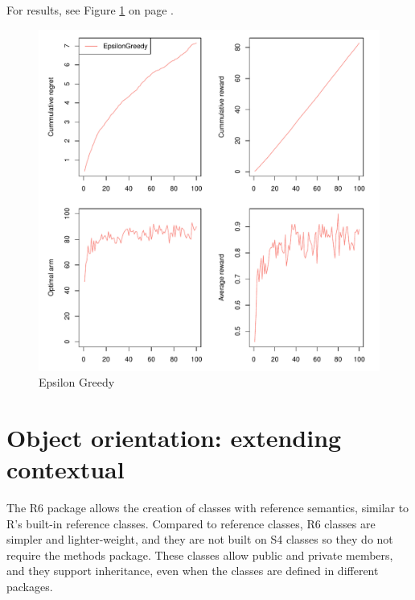 \documentclass[nojss]{jss}\usepackage[]{graphicx}\usepackage[]{color}
\makeatletter
\def\maxwidth{ %
  \ifdim\Gin@nat@width>\linewidth
    \linewidth
  \else
    \Gin@nat@width
  \fi
}
\newenvironment{knitrout}{}{} %
\makeatother
\begin{document}
For results, see Figure \ref{fig:fig1} on page \pageref{fig:fig1}.


\begin{center}
\begin{knitrout}
\color{fgcolor}\begin{figure}
\includegraphics[width=\maxwidth]{fig/fig1-1} \caption[Epsilon Greedy]{Epsilon Greedy}\label{fig:fig1}
\end{figure}


\end{knitrout}
\end{center}

\section{Object orientation: extending contextual}

The R6 package allows the creation of classes with reference semantics, similar to R's built-in reference classes. Compared to reference classes, R6 classes are simpler and lighter-weight, and they are not built on S4 classes so they do not require the methods package. These classes allow public and private members, and they support inheritance, even when the classes are defined in different packages.
\end{document}
